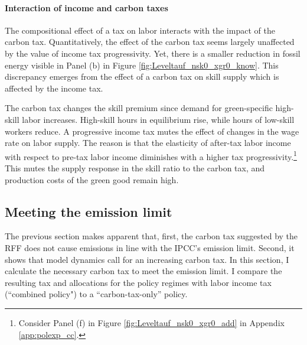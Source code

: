  
  
\paragraph{Interaction of income and carbon taxes}
The compositional effect of a tax on labor interacts with the impact of the carbon tax.
 Quantitatively, the effect of the carbon tax seems largely unaffected by the value of income tax progressivity.
 Yet, there is a smaller reduction in fossil energy visible in Panel (b) in Figure \ref{fig:Leveltauf_nsk0_xgr0_know}.
This discrepancy emerges from the effect of a carbon tax on skill supply which is affected by the income tax. 

    The carbon tax changes the skill premium since demand for green-specific high-skill labor increases. High-skill hours in equilibrium rise, while hours of low-skill workers reduce.  A progressive income tax mutes the effect of changes in the wage rate on labor supply. The reason is that the elasticity of after-tax labor income with respect to pre-tax labor income diminishes with a higher tax progressivity.\footnote{Consider Panel (f) in Figure \ref{fig:Leveltauf_nsk0_xgr0_add} in Appendix \ref{app:polexp_cc}.} This mutes the supply response in the skill ratio to the carbon tax, and production costs of the green good remain high.
   
  
\subsection{Meeting the emission limit}\label{subsec:meetlim}
 
The previous section makes apparent that, first, the carbon tax suggested by the RFF does not cause emissions in line with the IPCC's emission limit.  Second, it shows that model dynamics call for an increasing carbon tax. In this section, I calculate the necessary carbon tax to meet the emission limit. I compare the resulting tax and allocations for the policy regimes with labor income tax (``combined policy") to a ``carbon-tax-only'' policy.
 

